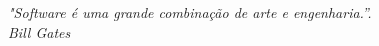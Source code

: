 \begin{epigrafe}
  \vspace*{\fill}
  \begin{flushright}
  \emph{"Software é uma grande combinação de arte e engenharia.”. 
    \\ Bill Gates}
  \end{flushright}
  \end{epigrafe}